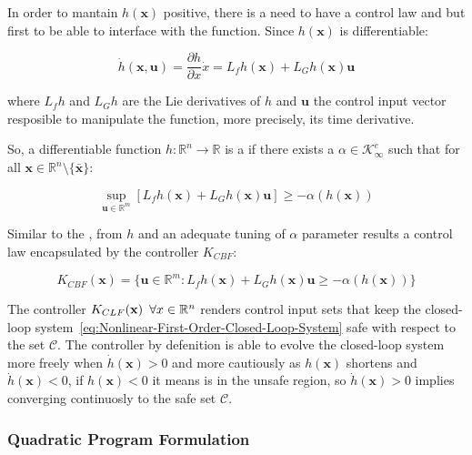 In order to mantain \(h( \mathbf{x} )\) positive, there is a need to have a control law and but first to be able to interface with the function. Since \(h( \mathbf{x} )\) is differentiable:  

\[\dot{h}(\mathbf{x}, \mathbf{u}) = \frac{\partial h}{\partial x}\dot{x} = L_fh(\mathbf{x}) + L_Gh(\mathbf{x})\mathbf{u} \]

where \(L_fh\) and \(L_Gh\) are the Lie derivatives of \(h\) and \(\mathbf{u}\) the control input vector resposible to manipulate the function, more precisely, its time derivative.\par

So, a differentiable function \( h: \mathbb{R}^n \rightarrow \mathbb{R}  \) is a  if there exists a \( \alpha \in \mathcal{K}^e_{\infty}  \) such that for all \( \mathbf{x} \in \mathbb{R}^n \setminus \{\bar{\mathbf{x}}\} \):

\begin{equation}
 \sup_{\mathbf{u} \in \mathbb{R}^m} [L_fh(\mathbf{x}) + L_Gh(\mathbf{x})\mathbf{u}] \geq -\alpha(h( \mathbf{x} ))
 \label{eq:CBF}
\end{equation}

Similar to the , from  \(h\) and an adequate tuning of \( \alpha \) parameter results a control law encapsulated by the controller \(K_{CBF}\):

\begin{equation}
 K_{CBF}(\mathbf{x}) = \{ \mathbf{u} \in \mathbb{R}^m: L_fh(\mathbf{x}) + L_Gh(\mathbf{x})\mathbf{u} \geq -\alpha(h( \mathbf{x} )) \}
 \label{eq:K-CBF}
\end{equation}

\newpage %

The controller \(K_{CLF}(\mathbf{x}) \hspace{0.5em} \forall x \in \mathbb{R}^n \) renders control input sets that keep the closed-loop system~\ref{eq:Nonlinear-First-Order-Closed-Loop-System} safe with respect to the set \(\mathcal{C}\). The controller by defenition is able to evolve the closed-loop system more freely when \(\dot{h}( \mathbf{x} ) > 0\) and more cautiously as \(h( \mathbf{x} ) \) shortens and \(\dot{h}( \mathbf{x} ) < 0\), if \(h( \mathbf{x} ) < 0\) it means is in the unsafe region, so \(\dot{h}( \mathbf{x}) > 0\) implies converging continuosly to the safe set \(\mathcal{C}\). \\ 




\subsubsection{Quadratic Program Formulation}
\label{subsub:quadratic_program_formulation}

